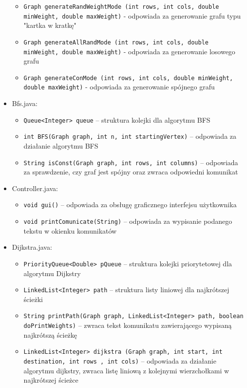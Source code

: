 \documentclass{article}
\begin{document}
\begin{itemize}
\begin{itemize}
    \item \texttt{\footnotesize Graph generateRandWeightMode (int rows, int cols, double minWeight, double maxWeight)} - odpowiada za generowanie grafu typu "kartka w kratkę"
    \item \texttt{\footnotesize Graph generateAllRandMode (int rows, int cols, double minWeight, double maxWeight)} - odpowiada za generowanie losowego grafu
    \item \texttt{\footnotesize Graph generateConMode (int rows, int cols, double minWeight, double maxWeight)} - odpowiada za generowanie spójnego grafu
    \end{itemize}
\item Bfs.java:
    \begin{itemize}
    \item \texttt{\footnotesize Queue<Integer> queue} – struktura kolejki dla algorytmu BFS
    \item \texttt{\footnotesize int BFS(Graph graph, int n, int startingVertex)} – odpowiada za działanie algorytmu BFS
    \item \texttt{\footnotesize String isConst(Graph graph, int rows, int columns)} – odpowiada za sprawdzenie, czy graf jest spójny oraz zwraca odpowiedni komunikat
    \end{itemize}
\item Controller.java:
    \begin{itemize}
    \item \texttt{\footnotesize void gui()} – odpowiada za obsługę graficznego interfejsu użytkownika
    \item \texttt{\footnotesize void printComunicate(String)} – odpowiada za wypisanie podanego tekstu w okienku komunikatów
    \end{itemize}
\item Dijkstra.java:
    \begin{itemize}
    \item \texttt{\footnotesize PriorityQueue<Double> pQueue} – struktura kolejki priorytetowej dla algorytmu Dijkstry
     \item \texttt{\footnotesize LinkedList<Integer> path} – struktura listy liniowej dla najkrótszej ścieżki
    \item \texttt{\footnotesize String printPath(Graph graph, LinkedList<Integer> path, boolean doPrintWeights)} – zwraca tekst komunikatu zawierającego wypisaną najkrótszą ścieżkę 
    \item \texttt{\footnotesize LinkedList<Integer> dijkstra (Graph graph, int start, int destination, int rows , int cols)} – odpowiada za działanie algorytmu dijkstry, zwraca listę liniową z kolejnymi wierzchołkami w najkrótszej ścieżce
    \end{itemize}


\end{itemize}
\end{document}

